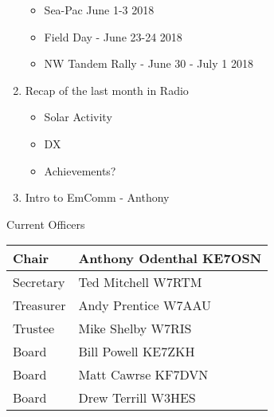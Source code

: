 \documentclass[letter,11pt]{extarticle}
\begin{document}
\begin{enumerate}
			\begin{itemize}
				\item Sea-Pac June 1-3 2018
				\item Field Day - June 23-24 2018
				\item NW Tandem Rally - June 30 - July 1 2018
			\end{itemize}
		\item Recap of the last month in Radio
			\begin{itemize}
				\item Solar Activity
				\item DX
				\item Achievements?
			\end{itemize}
		\item  Intro to EmComm - Anthony
	\end{enumerate}


	Current Officers \\
	\begin{tabular}{|l|l|} \hline
		Chair & Anthony Odenthal KE7OSN \\ \hline
		Secretary & Ted Mitchell W7RTM \\ \hline
		Treasurer & Andy Prentice W7AAU \\ \hline
		Trustee & Mike Shelby W7RIS   \\ \hline
		Board & Bill Powell KE7ZKH \\ \hline
		Board & Matt Cawrse KF7DVN \\ \hline
		Board & Drew Terrill W3HES\\ \hline
	\end{tabular}
	
	\subsection*{}
	
\end{document}
